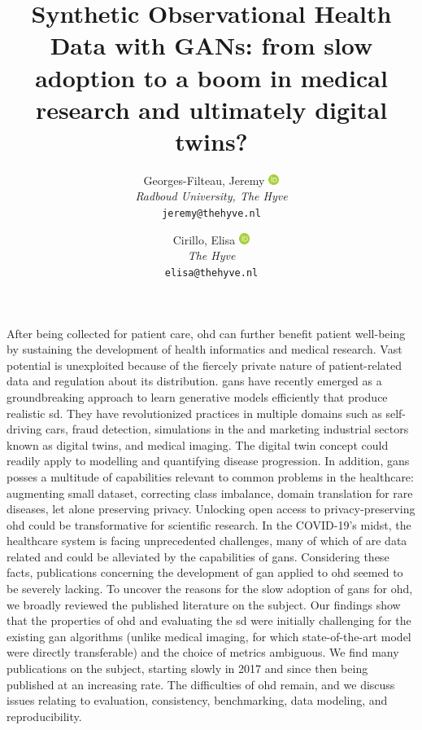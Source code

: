 \documentclass[10pt]{article}
\title{ Synthetic Observational Health Data with GANs: from slow adoption to a boom in medical research and ultimately digital twins?}
\author{
  Georges-Filteau, Jeremy \href{https://orcid.org/0000-0002-0352-6468}{\includegraphics[width=10pt]{assets/orcid.png}}\\[0.2cm]
  \small \textit{Radboud University, The Hyve}\\
  \small\texttt{jeremy@thehyve.nl}
  \and
  Cirillo, Elisa \href{https://orcid.org/0000-0002-0241-7833}{\includegraphics[width=10pt]{assets/orcid.png}}\\[0.2cm]
  \small \textit{The Hyve}\\
  \small\texttt{elisa@thehyve.nl}
}
\renewenvironment{abstract}
 {{\noindent\bfseries{\abstractname}\par\nobreak}\footnotesize}
 {\bigskip}
\begin{document}
    \maketitle
    \vspace{-1em}

    \begingroup
    \let\center\flushleft
    \let\endcenter\endflushleft
    \maketitle
    \endgroup


    \glsresetall
    \begin{abstract}
    After being collected for patient care, \gls{ohd} can further benefit patient well-being by sustaining the development of health informatics and medical research. Vast potential is unexploited because of the fiercely private nature of patient-related data and regulation about its distribution. 
    \glspl{gan} have recently emerged as a groundbreaking approach to learn generative models efficiently that produce realistic \gls{sd}. They have revolutionized practices in multiple domains such as self-driving cars, fraud detection, simulations in the and marketing industrial sectors known as digital twins, and medical imaging. The digital twin concept could readily apply to modelling and quantifying disease progression. In addition, \glspl{gan} posses a multitude of capabilities relevant to common problems in the healthcare: augmenting small dataset, correcting class imbalance, domain translation for rare diseases, let alone preserving privacy. Unlocking open access to privacy-preserving \gls{ohd} could be transformative for scientific research. In the COVID-19's midst, the healthcare system is facing unprecedented challenges, many of which of are data related and could be alleviated by the capabilities of \glspl{gan}.
   Considering these facts, publications concerning the development of  \gls{gan} applied to \gls{ohd} seemed to be severely lacking. To uncover the reasons for the slow adoption of \glspl{gan} for \gls{ohd}, we broadly reviewed the published literature on the subject. Our findings show that the properties of \gls{ohd} and evaluating the \gls{sd} were initially challenging for the existing \gls{gan} algorithms (unlike medical imaging, for which state-of-the-art model were directly transferable) and the choice of metrics ambiguous. We find many publications on the subject, starting slowly in 2017 and since then being published at an increasing rate. The difficulties of \gls{ohd} remain, and we discuss issues relating to evaluation, consistency, benchmarking, data modeling, and reproducibility.
    \end{abstract} 

    
    
    
    
    
    

    \pagebreak

    \printglossary[type=oalgo]
    \printglossary[type=\acronymtype]

    \pagebreak

    
\end{document}
